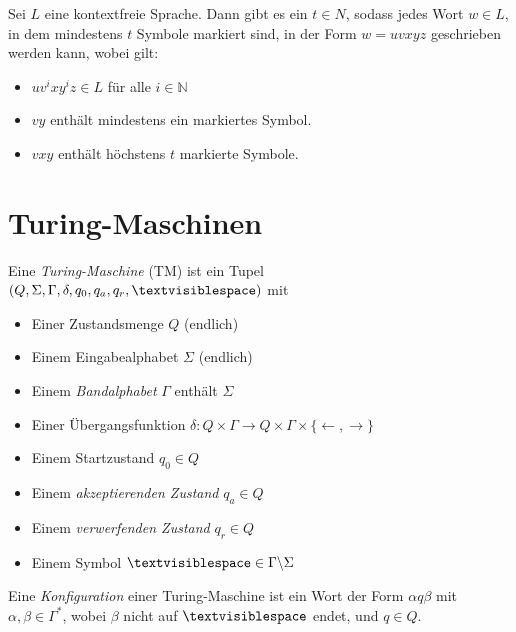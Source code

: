 \documentclass{cheat-sheet}
\begin{document}

\begin{satz}
Sei $L$ eine kontextfreie Sprache. Dann gibt es ein $t \in N$, sodass jedes Wort $w \in L$, in dem mindestens $t$ Symbole markiert sind, in der Form $w = uvxyz$ geschrieben werden kann, wobei gilt:

\begin{itemize}
  \item $uv^{i}xy^{i}z \in L$ für alle $i \in \mathbb{N}$
  \item $vy$ enthält mindestens ein markiertes Symbol.
  \item $vxy$ enthält höchstens $t$ markierte Symbole.
\end{itemize}
\end{satz}



\section{Turing-Maschinen}

\begin{defn}
Eine \emph{Turing-Maschine} (TM) ist ein Tupel $(Q, \Sigma, \Gamma, \delta, q_{0}, q_{a}, q_{r}, \textvisiblespace)$ mit

\begin{itemize}{\leftmargin=0em}
  \setlength{\leftmargin}{0pt}
  \item Einer Zustandsmenge $Q$ (endlich)
  \item Einem Eingabealphabet $\Sigma$ (endlich)
  \item Einem \emph{Bandalphabet} $\Gamma$ enthält $\Sigma$
  \item Einer Übergangsfunktion $\delta : Q \times \Gamma \to Q \times \Gamma \times \{ \leftarrow, \rightarrow \} $
  \item Einem Startzustand $q_{0} \in Q$
  \item Einem \emph{akzeptierenden Zustand} $q_{a} \in Q$
  \item Einem \emph{verwerfenden Zustand} $q_{r} \in Q$
  \item Einem Symbol $\textvisiblespace \in \Gamma \backslash \Sigma$
\end{itemize}
\end{defn}

\begin{defn}
Eine \emph{Konfiguration} einer Turing-Maschine ist ein Wort der Form $\alpha q \beta$ mit $\alpha, \beta \in \Gamma^{*}$, wobei $\beta$ nicht auf $\textvisiblespace$ endet, und $q \in Q$.
\end{defn}
\end{document}
